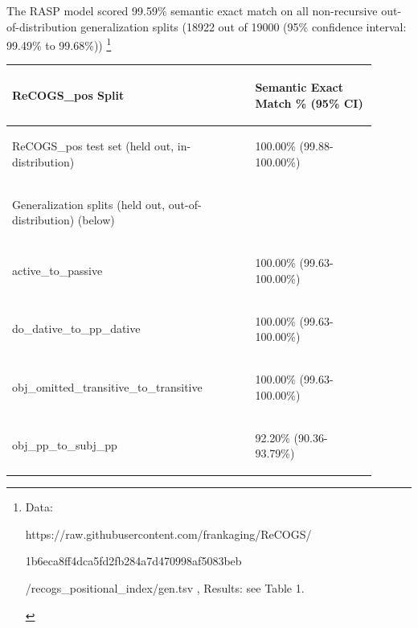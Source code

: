 \documentclass[11pt]{article}
\begin{document}
The RASP model scored 99.59\% semantic exact match on all non-recursive out-of-distribution generalization splits (18922 out of 19000 (95\% confidence interval: 99.49\% to 99.68\%))
\footnote{
\begin{tiny}
Data: 

https://raw.githubusercontent.com/frankaging/ReCOGS/

1b6eca8ff4dca5fd2fb284a7d470998af5083beb

/recogs\_positional\_index/gen.tsv , Results: see Table 1.
\end{tiny}
}

\begin{table}
\centering
\begin{tabular}{p{0.6\linewidth} p{0.3\linewidth}}
\hline
\begin{tiny}\textbf{ReCOGS\_pos Split}\end{tiny} & \begin{tiny}\textbf{Semantic Exact Match \% (95\% CI)}\end{tiny} \\
\hline
\begin{tiny}ReCOGS\_pos test set (held out, in-distribution)\end{tiny} & \begin{tiny} 100.00\% (99.88-100.00\%)\end{tiny} \\
\hline
\begin{tiny}Generalization splits (held out, out-of-distribution) (below)\end{tiny} & \\
\hline
\begin{tiny}active\_to\_passive\end{tiny} & \begin{tiny}100.00\% (99.63-100.00\%)\end{tiny} \\
\begin{tiny}do\_dative\_to\_pp\_dative\end{tiny} & \begin{tiny} 100.00\% (99.63-100.00\%)\end{tiny} \\
\begin{tiny}obj\_omitted\_transitive\_to\_transitive\end{tiny} & \begin{tiny} 100.00\% (99.63-100.00\%)\end{tiny} \\
\begin{tiny}obj\_pp\_to\_subj\_pp\end{tiny} & \begin{tiny} 92.20\% (90.36-93.79\%)\end{tiny} \\

\end{tabular}
\end{table}
\end{document}
